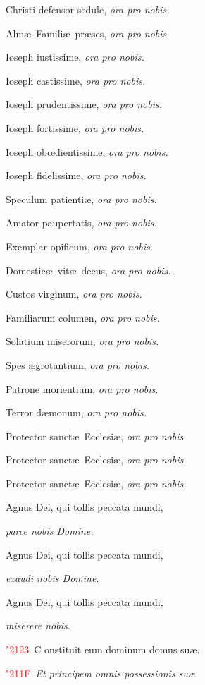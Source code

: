 \documentclass[12pt]{article}\errorcontextlines=9
\newcommand\versic[1]{%
\textcolor{red}{\char"2123\ }#1%
}
\newcommand\response[1]{%
\textcolor{red}{\char"211F\ }#1%
}
\begin{document}
\begin{multicols}{2}
Christi defensor sedule, \hfill \textit{ora pro nobis.}

Alm\ae\ Famili\ae\ pr\ae ses, \hfill \textit{ora pro nobis.}

Ioseph iustissime, \hfill \textit{ora pro nobis.}

Ioseph castissime, \hfill \textit{ora pro nobis.}

Ioseph prudentissime, \hfill \textit{ora pro nobis.}

Ioseph fortissime, \hfill \textit{ora pro nobis.}

Ioseph ob\oe dientissime, \hfill \textit{ora pro nobis.}

Ioseph fidelissime, \hfill \textit{ora pro nobis.}

Speculum patienti\ae, \hfill \textit{ora pro nobis.}

Amator paupertatis, \hfill \textit{ora pro nobis.}

Exemplar opificum, \hfill \textit{ora pro nobis.}

Domestic\ae\ vit\ae\ decus, \hfill \textit{ora pro nobis.}

Custos virginum, \hfill \textit{ora pro nobis.}

Familiarum columen, \hfill \textit{ora pro nobis.}

Solatium miserorum, \hfill \textit{ora pro nobis.}

Spes \ae grotantium, \hfill \textit{ora pro nobis.}

Patrone morientium, \hfill \textit{ora pro nobis.}

Terror d\ae monum, \hfill \textit{ora pro nobis.}

Protector sanct\ae\ Ecclesi\ae, \hfill \textit{ora pro nobis.}

Protector sanct\ae\ Ecclesi\ae, \hfill \textit{ora pro nobis.}

Protector sanct\ae\ Ecclesi\ae, \hfill \textit{ora pro nobis.}

Agnus Dei, qui tollis peccata mundi,

\hfill \textit{parce nobis Domine.}

Agnus Dei, qui tollis peccata mundi,

\hfill \textit{exaudi nobis Domine.}

Agnus Dei, qui tollis peccata mundi,

\hfill \textit{miserere nobis.}

\bigskip

\versic Constituit eum dominum domus su\ae.

\response \textit{Et principem omnis possessionis su\ae.}


\end{multicols}
\end{document}
